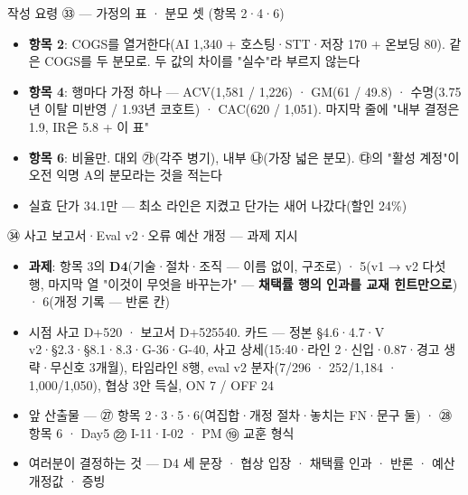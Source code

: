 \begin{frame}{작성 요령 ㉝ — 가정의 표 · 분모 셋 (항목 2·4·6)}
\begin{itemize}
\item \textbf{항목 2}: COGS를 열거한다(AI 1,340 + 호스팅·STT·저장 170 + 온보딩 80). 같은 COGS를 두 분모로. 두 값의 차이를 "실수"라 부르지 않는다
\item \textbf{항목 4}: 행마다 가정 하나 — ACV(1,581 / 1,226) · GM(61 / 49.8) · 수명(3.75년 이탈 미반영 / 1.93년 코호트) · CAC(620 / 1,051). 마지막 줄에 "내부 결정은 1.9, IR은 5.8 + 이 표"
\item \textbf{항목 6}: 비율만. 대외 ㉮(각주 병기), 내부 ㉯(가장 넓은 분모). ㉰의 "활성 계정"이 오전 익명 A의 분모라는 것을 적는다
\item 실효 단가 34.1만 — 최소 라인은 지켰고 단가는 새어 나갔다(할인 24\%)
\end{itemize}
\end{frame}

\begin{frame}{㉞ 사고 보고서·Eval v2·오류 예산 개정 — 과제 지시}
\begin{itemize}
\item \textbf{과제}: 항목 3의 \textbf{D4}(기술·절차·조직 — 이름 없이, 구조로) · 5(v1 → v2 다섯 행, 마지막 열 "이것이 무엇을 바꾸는가" — \textbf{채택률 행의 인과를 교재 힌트만으로}) · 6(개정 기록 — 반론 칸)
\item 시점 사고 D+520 · 보고서 D+525\til{}540. 카드 — 정본 §4.6·4.7·V v2·§2.3·§8.1·8.3·G-36·G-40, 사고 상세(15:40·라인 2·신입·0.87·경고 생략·무신호 3개월), 타임라인 8행, eval v2 분자(7/296 · 252/1,184 · 1,000/1,050), 협상 3안 득실, ON 7 / OFF 24
\item 앞 산출물 — ㉗ 항목 2·3·5·6(여집합·개정 절차·놓치는 FN·문구 둘) · ㉘ 항목 6 · Day5 ㉒ I-11·I-02 · PM ⑲ 교훈 형식
\item 여러분이 결정하는 것 — D4 세 문장 · 협상 입장 · 채택률 인과 · 반론 · 예산 개정값 · 증빙
\end{itemize}
\end{frame}

